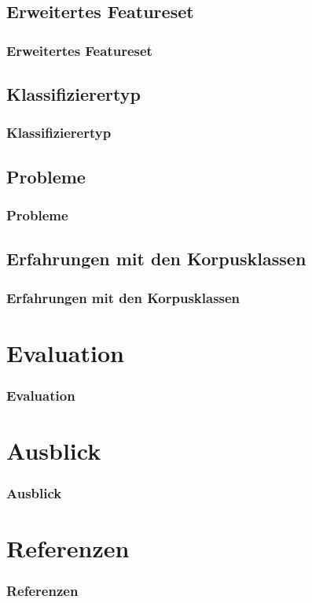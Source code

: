 \documentclass{beamer}
\begin{document}
	\subsection{Erweitertes Featureset}
	\begin{frame}
		\frametitle{Erweitertes Featureset}
		
	\end{frame}
	\subsection{Klassifizierertyp}
	\begin{frame}
		\frametitle{Klassifizierertyp}
		
	\end{frame}
	\subsection{Probleme}
	\begin{frame}
		\frametitle{Probleme}
		
	\end{frame}
	\subsection{Erfahrungen mit den Korpusklassen}
	\begin{frame}
		\frametitle{Erfahrungen mit den Korpusklassen}
		
	\end{frame}
\section{Evaluation}
	\begin{frame}
		\frametitle{Evaluation}
		
	\end{frame}
\section{Ausblick}
	\begin{frame}
		\frametitle{Ausblick}
		
	\end{frame}
\section{Referenzen}
	\begin{frame}
		\frametitle{Referenzen}
		
		\end{frame}
\end{document}
